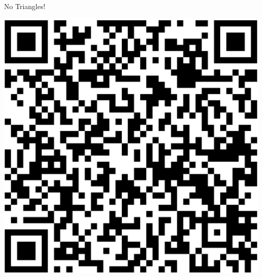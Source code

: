 \documentclass{article}
\begin{document}
    
    \begin{huge} No Triangles! \end{huge} 
    \hfill 
    \includegraphics[scale=.05]{No Triangles QR Code.png}

    \hrulefill

    \bigskip
\end{document}
